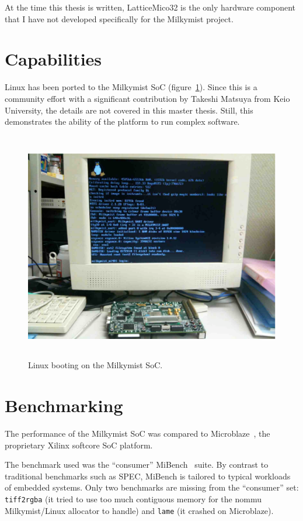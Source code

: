 \documentclass[a4paper,11pt]{kthesis}
\begin{document}
At the time this thesis is written, LatticeMico32 is the only hardware component that I have not developed specifically for the Milkymist project.

\section{Capabilities}
Linux has been ported to the Milkymist SoC (figure~\ref{fig:linux}). Since this is a community effort with a significant contribution by Takeshi Matsuya from Keio University, the details are not covered in this master thesis. Still, this demonstrates the ability of the platform to run complex software.

\begin{figure}[htp]
\centering
\includegraphics[height=100mm]{linux.eps}
\caption{Linux booting on the Milkymist SoC.}
\label{fig:linux}
\end{figure}

\section{Benchmarking}
The performance of the Milkymist SoC was compared to Microblaze~\cite{microblaze}, the proprietary Xilinx softcore SoC platform.

The benchmark used was the ``consumer'' MiBench~\cite{mibench} suite. By contrast to traditional benchmarks such as SPEC, MiBench is tailored to typical workloads of embedded systems. Only two benchmarks are missing from the ``consumer'' set: \verb!tiff2rgba! (it tried to use too much contiguous memory for the nommu Milkymist/Linux allocator to handle) and \verb!lame! (it crashed on Microblaze).
\end{document}
